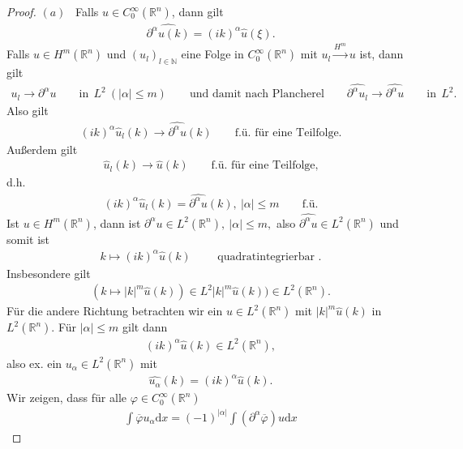 \documentclass[
paper=a4,
bibtotocnumbered,
liststotocnumbered,
tablecaptionabove,
pointlessnumbers,
twoside,
openright,
10pt
]
{report}
\let\phi\varphi
\theoremstyle{definition}
\numberwithin{equation}{chapter}
\begin{document}
\begin{proof}
$(a)$ \ Falls $u \in C_0^{\infty}(\mathbb{R}^n)$, dann gilt
\begin{align*}
\widehat{\partial^\alpha u(k)}=(ik)^\alpha \widehat{u}(\xi).
\end{align*}
Falls $u \in H^m(\mathbb{R}^n)$ und $(u_l)_{l \in \mathbb{N}}$ eine Folge in $C_0^{\infty}(\mathbb{R}^n)$ mit $u_l \overset{H^m}{\to} u$ ist, dann gilt
\begin{align*}
 u_l \to \partial^\alpha u \qquad \text{in} \ \ L^2 \ (|\alpha| \leq m) \qquad \text{und damit nach Plancherel} \qquad \widehat{\partial^\alpha u_l} \to \widehat{\partial^\alpha u} \qquad \text{in} \ \ L^2.
\end{align*}
Also gilt 
\begin{align*}
(ik)^\alpha \widehat{u}_l(k) \to \widehat{\partial^\alpha u}(k) \qquad \text{f.ü. für eine Teilfolge.} 
\end{align*}
Außerdem gilt 
\begin{align*}
\widehat{u}_l(k) \to \widehat{ u}(k) \qquad \text{f.ü. für eine Teilfolge,}
\end{align*}
d.h.
\begin{align*}
(ik)^\alpha \widehat{u}_l(k) = \widehat{\partial^\alpha u}(k),\ |\alpha| \leq m \qquad \text{f.ü.}
\end{align*}
Ist $u \in H^m(\mathbb{R}^n)$, dann ist $\partial^\alpha u \in L^2(\mathbb{R}^n), \ |\alpha| \leq m,$ also $\widehat{\partial^\alpha u} \in L^2(\mathbb{R}^n)$ und somit ist
\begin{align*}
k \mapsto (ik)^\alpha \hat u(k) \qquad \text{  quadratintegrierbar .}
\end{align*}
Insbesondere gilt
\begin{align*}
(k \mapsto |k|^m \hat u(k)) \in L^2|k|^m \hat u(k)) \in L^2(\mathbb{R}^n).
\end{align*}
Für die andere Richtung betrachten wir ein $u \in L^2(\mathbb{R}^n)$ mit $|k|^m \hat u(k)$ in $L^2(\mathbb{R}^n)$. Für $|\alpha| \leq m$ gilt dann
\begin{align*}
(ik)^\alpha \widehat{u}(k) \in L^2(\mathbb{R}^n),
\end{align*}
also ex. ein $u_\alpha \in L^2(\mathbb{R}^n)$ mit 
\begin{align*}
\widehat{u_\alpha}(k) = (ik)^\alpha \widehat{u}(k).
\end{align*}
Wir zeigen, dass für alle $\phi \in C_0^\infty (\mathbb{R}^n) $
\begin{align*}
\int \overline{\phi} u_\alpha \mathrm{d}x = (-1)^{|\alpha|}\int \left(\partial^\alpha \overline{\phi}\right) u \mathrm{d}x

\end{align*}
\end{proof}
\end{document}
